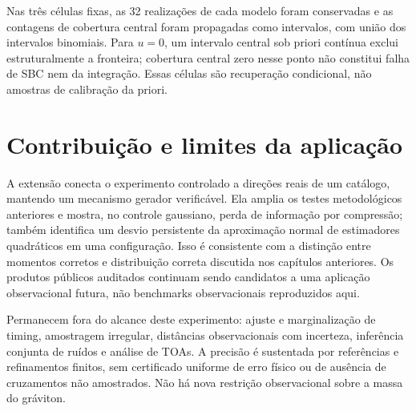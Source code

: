Nas três células fixas, as 32 realizações de cada modelo foram conservadas e as contagens de cobertura central foram propagadas como intervalos, com união dos intervalos binomiais. Para $u=0$, um intervalo central sob priori contínua exclui estruturalmente a fronteira; cobertura central zero nesse ponto não constitui falha de SBC nem da integração. Essas células são recuperação condicional, não amostras de calibração da priori.

\section{Contribuição e limites da aplicação}

A extensão conecta o experimento controlado a direções reais de um catálogo, mantendo um mecanismo gerador verificável. Ela amplia os testes metodológicos anteriores e mostra, no controle gaussiano, perda de informação por compressão; também identifica um desvio persistente da aproximação normal de estimadores quadráticos em uma configuração. Isso é consistente com a distinção entre momentos corretos e distribuição correta discutida nos capítulos anteriores. Os produtos públicos auditados continuam sendo candidatos a uma aplicação observacional futura, não benchmarks observacionais reproduzidos aqui.

Permanecem fora do alcance deste experimento: ajuste e marginalização de timing, amostragem irregular, distâncias observacionais com incerteza, inferência conjunta de ruídos e análise de TOAs. A precisão é sustentada por referências e refinamentos finitos, sem certificado uniforme de erro físico ou de ausência de cruzamentos não amostrados. Não há nova restrição observacional sobre a massa do gráviton.
